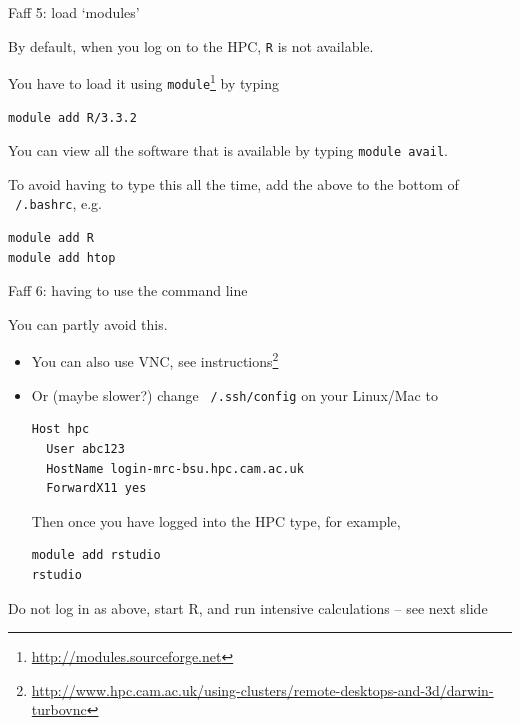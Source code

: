 \documentclass[t,10pt]{beamer}
\let\oldfootnote\footnote
\renewcommand\footnote[1][]{\oldfootnote[frame,#1]}
\begin{document}
\begin{frame}[fragile]{Faff 5: load `modules'}

By default, when you log on to the HPC, \texttt{R} is \alert{not available}.

\bigskip
You have to load it using \texttt{module}\footnote{\url{http://modules.sourceforge.net}} by typing

\begin{verbatim}
module add R/3.3.2
\end{verbatim}

You can view all the software that is available by typing \texttt{module avail}.

\bigskip
To avoid having to type this all the time, add the above to the bottom of \texttt{~/.bashrc}, e.g.

\begin{verbatim}
module add R
module add htop
\end{verbatim}
\end{frame}

\begin{frame}[fragile]{Faff 6: having to use the command line}

You can \alert{partly} avoid this.

\begin{itemize}
\item
You can also use \alert{VNC}, see instructions\footnote{\url{http://www.hpc.cam.ac.uk/using-clusters/remote-desktops-and-3d/darwin-turbovnc}}

\item Or (maybe slower?) change \texttt{~/.ssh/config} on your Linux/Mac to

\begin{verbatim}
Host hpc
  User abc123
  HostName login-mrc-bsu.hpc.cam.ac.uk
  ForwardX11 yes
\end{verbatim}

Then once you have logged into the HPC type, for example,
\begin{verbatim}
module add rstudio
rstudio
\end{verbatim}
\end{itemize}

\alert{Do not log in as above, start R, and run intensive calculations -- see next slide}

\end{frame}
\end{document}
